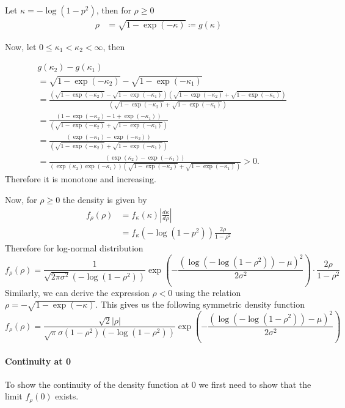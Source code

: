 \documentclass{amsart}
\begin{document}
Let $\kappa = -\log(1-p^2)$, then for $\rho \ge 0$
\begin{align}
	\rho & = \sqrt{1-\exp(-\kappa)}\coloneqq g(\kappa)
\end{align}

Now, let $0\le\kappa_1 < \kappa_2<\infty$, then

\begin{align}
	&g(\kappa_2) - g(\kappa_1)\\
	&=\sqrt{1-\exp(-\kappa_2)} - \sqrt{1-\exp(-\kappa_1)}\\
	&= \frac{(\sqrt{1-\exp(-\kappa_2)} - \sqrt{1-\exp(-\kappa_1)})(\sqrt{1-\exp(-\kappa_2)} + \sqrt{1-\exp(-\kappa_1)})}{(\sqrt{1-\exp(-\kappa_2)} + \sqrt{1-\exp(-\kappa_1)})}\\
	&= \frac{(1-\exp(-\kappa_2) - 1+\exp(-\kappa_1))}{(\sqrt{1-\exp(-\kappa_2)} + \sqrt{1-\exp(-\kappa_1)})}\\
	&= \frac{(\exp(-\kappa_1)-\exp(-\kappa_2))}{(\sqrt{1-\exp(-\kappa_2)} + \sqrt{1-\exp(-\kappa_1)})}\\
	&= \frac{(\exp(\kappa_2)-\exp(-\kappa_1))}
	{(\exp(\kappa_2)\exp(-\kappa_1))(\sqrt{1-\exp(-\kappa_2)} + \sqrt{1-\exp(-\kappa_1)})} >0.
\end{align}
Therefore it is monotone and increasing.

Now, for $\rho \ge 0$ the density is given by
\begin{align}
	f_{\rho}(\rho)&=f_{\kappa}(\kappa)\left|\frac{d \kappa}{d \rho}\right|\\
	&=f_{\kappa}\left(-\log(1-p^2)\right)\frac{2\rho}{1-\rho^2}
\end{align}
Therefore for log-normal distribution
\begin{equation}
	f_{\rho}(\rho)
	= \frac{1}{\sqrt{2\pi\sigma^2}(-\log(1-\rho^2))} 
	\exp\left(-\frac{(\log(-\log(1-\rho^2))-\mu)^2}{2\sigma^2}\right)
	\cdot \frac{2\rho}{1-\rho^2}
\end{equation}
Similarly, we can derive the expression $\rho<0$ using the relation
$\rho = -\sqrt{1-\exp(-\kappa)}$. This gives us the following
symmetric density function
\begin{equation}
	f_{\rho}(\rho)
	= \frac{\sqrt{2}|\rho|}{\sqrt{\pi}\sigma(1-\rho^2)(-\log(1-\rho^2))} 
	\exp\left(-\frac{(\log(-\log(1-\rho^2))-\mu)^2}{2\sigma^2}\right)
\end{equation}

\paragraph{Continuity at 0} To show the continuity of the density function at 0 we first need to show that the limit $f_{\rho}(0)$
exists.
\end{document}
